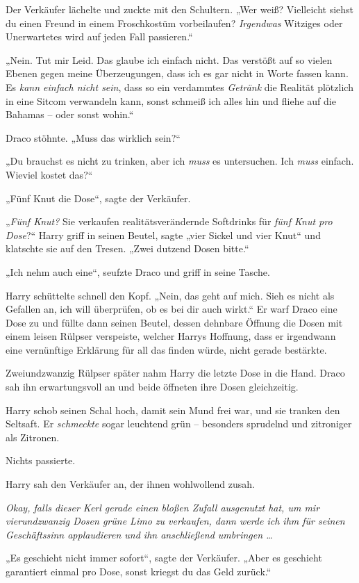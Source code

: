 {Der Verkäufer lächelte und zuckte mit den Schultern. „Wer weiß? Vielleicht siehst du einen Freund in einem Froschkostüm vorbeilaufen? \emph{Irgendwas} Witziges oder Unerwartetes wird auf jeden Fall passieren.“

„Nein. Tut mir Leid. Das glaube ich einfach nicht. Das verstößt auf so vielen Ebenen gegen meine Überzeugungen, dass ich es gar nicht in Worte fassen kann. Es \emph{kann einfach nicht sein}, dass so ein verdammtes \emph{Getränk} die Realität plötzlich in eine Sitcom verwandeln kann, sonst schmeiß ich alles hin und fliehe auf die Bahamas -- oder sonst wohin.“

Draco stöhnte. „Muss das wirklich sein?“

„Du brauchst es nicht zu trinken, aber ich \emph{muss} es untersuchen. Ich \emph{muss} einfach. Wieviel kostet das?“

„Fünf Knut die Dose“, sagte der Verkäufer.

„\emph{Fünf Knut?} Sie verkaufen realitätsverändernde Softdrinks für \emph{fünf Knut pro Dose}?“ Harry griff in seinen Beutel, sagte „vier Sickel und vier Knut“ und klatschte sie auf den Tresen. „Zwei dutzend Dosen bitte.“

„Ich nehm auch eine“, seufzte Draco und griff in seine Tasche.

Harry schüttelte schnell den Kopf. „Nein, das geht auf mich. Sieh es nicht als Gefallen an, ich will überprüfen, ob es bei dir auch wirkt.“ Er warf Draco eine Dose zu und füllte dann seinen Beutel, dessen dehnbare Öffnung die Dosen mit einem leisen Rülpser verspeiste, welcher Harrys Hoffnung, dass er irgendwann eine vernünftige Erklärung für all das finden würde, nicht gerade bestärkte.

Zweiundzwanzig Rülpser später nahm Harry die letzte Dose in die Hand. Draco sah ihn erwartungsvoll an und beide öffneten ihre Dosen gleichzeitig.

Harry schob seinen Schal hoch, damit sein Mund frei war, und sie tranken den Seltsaft. Er \emph{schmeckte} sogar leuchtend grün -- besonders sprudelnd und zitroniger als Zitronen.

Nichts passierte.

Harry sah den Verkäufer an, der ihnen wohlwollend zusah.

\emph{Okay, falls dieser Kerl gerade einen bloßen Zufall ausgenutzt hat, um mir vierundzwanzig Dosen grüne Limo zu verkaufen, dann werde ich ihm für seinen Geschäftssinn applaudieren und ihn anschließend umbringen …}

„Es geschieht nicht immer sofort“, sagte der Verkäufer. „Aber es geschieht garantiert einmal pro Dose, sonst kriegst du das Geld zurück.“

}
